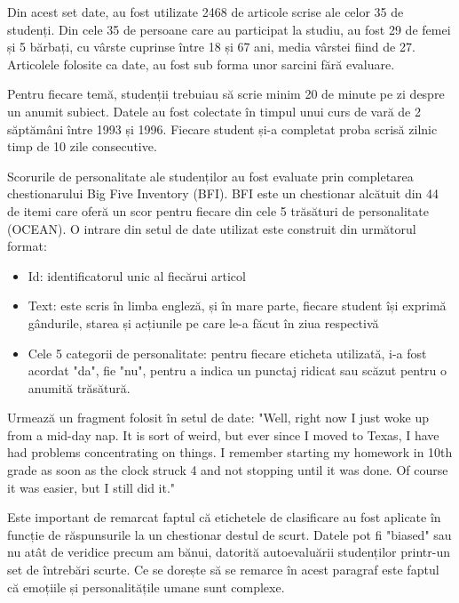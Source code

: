 \documentclass[a4paper, 12pt]{report}
\begin{document}
	Din acest set date, au fost utilizate 2468 de articole scrise ale celor 35 de studenți. Din cele 35 de persoane care au participat la studiu, au fost 29 de femei și 5 bărbați, cu vârste cuprinse între 18 și 67 ani, media vârstei fiind de 27. Articolele folosite ca date, au fost sub forma unor sarcini fără evaluare. 

	Pentru fiecare temă, studenții trebuiau să scrie minim 20 de minute pe zi despre un anumit subiect. Datele au fost colectate în timpul unui curs de vară de 2 săptămâni între 1993 și 1996. Fiecare student și-a completat proba scrisă zilnic timp de 10 zile consecutive. 

	Scorurile de personalitate ale studenților au fost evaluate prin completarea chestionarului Big Five Inventory (BFI). BFI este un chestionar alcătuit din 44 de itemi care oferă un scor pentru fiecare din cele 5 trăsături de personalitate (OCEAN). O intrare din setul de date utilizat este construit din următorul format: 
	\begin{itemize}
		\item Id: identificatorul unic al fiecărui articol
		\item Text: este scris în limba engleză, și în mare parte, fiecare student își exprimă gândurile, starea și acțiunile pe care le-a făcut în ziua respectivă
		\item Cele 5 categorii de personalitate: pentru fiecare eticheta utilizată, i-a fost acordat "da", fie "nu", pentru a indica un punctaj ridicat sau scăzut pentru o anumită trăsătură.
	\end{itemize}

	Urmează un fragment folosit în setul de date: "Well, right now I just woke up from a mid-day nap. It is sort of weird, but ever since I moved to Texas, I have had problems concentrating on things. I remember starting my homework in 10th grade as soon as the clock struck 4 and not stopping until it was done. Of course it was easier, but I still did it."
	
	Este important de remarcat faptul că etichetele de clasificare au fost aplicate în funcție de răspunsurile la un chestionar destul de scurt. Datele pot fi "biased" sau nu atât de veridice precum am bănui, datorită autoevaluării studenților printr-un set de întrebări scurte. Ce se dorește să se remarce în acest paragraf este faptul că emoțiile și personalitățile umane sunt complexe.
	
\end{document}
